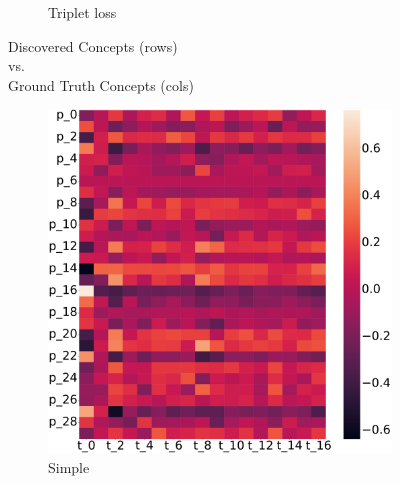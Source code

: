 \begin{figure}
\begin{minipage}{.49\textwidth}
\begin{subfigure}{.49\textwidth}
		\caption{Triplet loss}
	\end{subfigure}
\end{minipage}
\hfill
\begin{minipage}{.49\textwidth}
	\centering
	{\small\sc Discovered Concepts (rows)\\vs.\\Ground Truth Concepts (cols)}\\
\begin{subfigure}{.49\textwidth}
	\includegraphics[width=\textwidth]{imgs/cem/KANDY_2-vit-continual-notriplet_pt.pdf}
	\caption{Simple}
\end{subfigure}
\begin{subfigure}{.49\textwidth}

\end{subfigure}
\end{minipage}
\end{figure}
